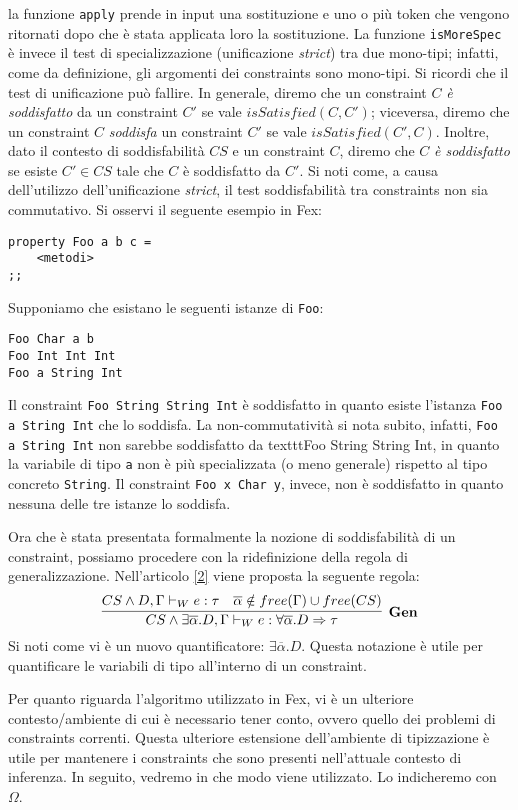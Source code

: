 \documentclass[10pt,a4paper]{article}
\begin{document}
la funzione \texttt{apply} prende in input una sostituzione e uno o più token che vengono ritornati dopo che è stata
applicata loro la sostituzione. La funzione \texttt{isMoreSpec} è invece il test di specializzazione (unificazione
\textit{strict}) tra due mono-tipi; infatti, come da definizione, gli argomenti dei constraints sono mono-tipi.
Si ricordi che il test di unificazione può fallire. In generale, diremo che un constraint $ C $ \textit{è soddisfatto} da
un constraint $ C' $ se vale $ isSatisfied(C, C') $; viceversa, diremo che un constraint $ C $ \textit{soddisfa} un
constraint $ C' $ se vale $ isSatisfied(C', C) $. Inoltre, dato il contesto di soddisfabilità $ CS $ e un constraint $ C $,
diremo che $ C $ \textit{è soddisfatto} se esiste $ C' \in CS $ tale che $ C $ è soddisfatto da $ C' $.
Si noti come, a causa dell'utilizzo dell'unificazione \textit{strict}, il test soddisfabilità tra constraints non sia
commutativo. Si osservi il seguente esempio in Fex:
\begin{lstlisting}
property Foo a b c =
    <metodi>
;;
\end{lstlisting}
Supponiamo che esistano le seguenti istanze di \texttt{Foo}:
\begin{lstlisting}
Foo Char a b
Foo Int Int Int
Foo a String Int
\end{lstlisting}
Il constraint \texttt{Foo String String Int} è soddisfatto in quanto esiste l'istanza \texttt{Foo a String Int} che
lo soddisfa. La non-commutatività si nota subito, infatti, \texttt{Foo a String Int} non sarebbe soddisfatto da
texttt{Foo String String Int}, in quanto la variabile di tipo \texttt{a} non è più specializzata (o meno generale) rispetto
al tipo concreto \texttt{String}. Il constraint \texttt{Foo x Char y}, invece, non è soddisfatto in quanto nessuna
delle tre istanze lo soddisfa.

Ora che è stata presentata formalmente la nozione di soddisfabilità di un constraint, possiamo procedere
con la ridefinizione della
regola di generalizzazione. Nell'articolo \hyperlink{bibl2}{[2]} viene proposta la seguente regola:
\[ \infer[\textbf{Gen}]{CS \wedge \exists \overline{\alpha}. D, \Gamma \vdash_W e : \forall \overline{\alpha}. D \Rightarrow \tau}{CS \wedge D, \Gamma \vdash_W e : \tau & \overline{\alpha} \notin free(\Gamma) \cup free(CS)} \]
Si noti come vi è un nuovo quantificatore: $ \exists \overline{\alpha}. D $. Questa notazione è utile per quantificare
le variabili di tipo all'interno di un constraint.

Per quanto riguarda l'algoritmo utilizzato in Fex, vi è un ulteriore contesto/ambiente di cui è necessario tener conto,
ovvero quello dei problemi di constraints correnti. Questa ulteriore estensione dell'ambiente di tipizzazione è utile
per mantenere i constraints che sono presenti nell'attuale contesto di inferenza. In seguito, vedremo in che modo
viene utilizzato. Lo indicheremo con $ \Omega $.
\end{document}
